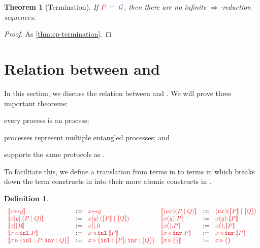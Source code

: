 \documentclass[draft,submission,copyright,creativecommons]{eptcs}
\newtheorem{definition}{Definition}
\newtheorem{theorem}{Theorem}
\begin{document}
\begin{theorem}[Termination]\label{thm:hcp-termination}
  If $\seq[P]{\mathcal{G}}$, then there are no infinite $\Longrightarrow$-reduction sequences.
\end{theorem}\vspace*{-0.75\baselineskip}%
\begin{proof}
  As \cref{thm:cp-termination}.
\end{proof}


\section{Relation between \cp and \hcp}
\label{sec:cp2hcp}

In this section, we discuss the relation between \cp and \hcp. We will prove three important theorems:
\begin{enumerate*}[label={\alph*)}]
\item every \cp process is an \hcp process;
\item \hcp processes represent multiple entangled \cp processes; and
\item \hcp supports the same protocols as \cp.
\end{enumerate*}
To facilitate this, we define a translation from terms in \cp to terms in \hcp which breaks down the term constructs in \cp into their more atomic constructs in \hcp.
\begin{definition}\label{def:cp2hcp-terms}
  \[
    \begin{array}{lcllcl}
         \tm{\mtf{\cpLink{x}{y}}}
      &  := & \tm{\cpLink{x}{y}}
      &  \tm{\mtf{\cpCut{x}{P}{Q}}}
      &  := & \tm{\piNew{x}{(\piPar{\mtf{P}}{\mtf{Q}})}}
      \\ \tm{\mtf{\cpSend{x}{y}{P}{Q}}}
      &  := & \tm{\piBoundSend{x}{y}{(\piPar{\mtf{P}}{\mtf{Q}})}}
      &  \tm{\mtf{\cpRecv{x}{y}{P}}}
      &  := & \tm{\piRecv{x}{y}{\mtf{P}}}
      \\ \tm{\mtf{\cpHalt{x}}}
      &  := & \tm{\piBoundSend{x}{}{\piHalt}}
      &  \tm{\mtf{\cpWait{x}{P}}}
      &  := & \tm{\piRecv{x}{}{\mtf{P}}}
      \\ \tm{\mtf{\cpInl{x}{P}}}
      &  := & \tm{\cpInl{x}{\mtf{P}}}
      &  \tm{\mtf{\cpInr{x}{P}}}
      &  := & \tm{\cpInr{x}{\mtf{P}}}
      \\ \tm{\mtf{\cpCase{x}{P}{Q}}}
      &  := & \tm{\cpCase{x}{\mtf{P}}{\mtf{Q}}}
      &  \tm{\mtf{\cpAbsurd{x}}}
      &  := & \tm{\cpAbsurd{x}}
    \end{array}
  \]
\end{definition}\noindent
\end{document}
